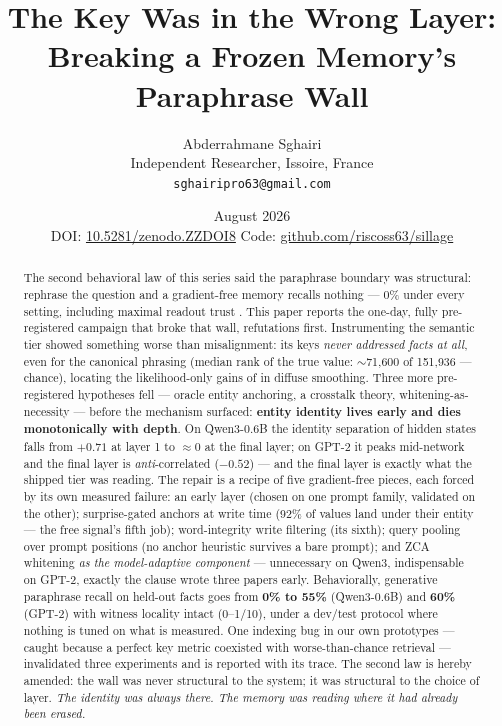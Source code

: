 \documentclass[11pt]{article}
\title{\bfseries The Key Was in the Wrong Layer:\\
Breaking a Frozen Memory's Paraphrase Wall}
\author{Abderrahmane Sghairi\\
\small Independent Researcher, Issoire, France\\
\small \texttt{sghairipro63@gmail.com}}
\date{August 2026\\[2pt]
\small DOI: \href{https://doi.org/10.5281/zenodo.ZZDOI8}{10.5281/zenodo.ZZDOI8}
\qquad Code: \href{https://github.com/riscoss63/sillage}{github.com/riscoss63/sillage}}
\begin{document}
\maketitle

\begin{abstract}
The second behavioral law of this series said the paraphrase boundary was structural: rephrase the question and a gradient-free memory recalls nothing --- 0\% under every setting, including maximal readout trust \cite{behavior}. This paper reports the one-day, fully pre-registered campaign that broke that wall, refutations first. Instrumenting the semantic tier showed something worse than misalignment: its keys \emph{never addressed facts at all}, even for the canonical phrasing (median rank of the true value: $\sim$71{,}600 of 151{,}936 --- chance), locating the likelihood-only gains of \cite{router} in diffuse smoothing. Three more pre-registered hypotheses fell --- oracle entity anchoring, a crosstalk theory, whitening-as-necessity --- before the mechanism surfaced: \textbf{entity identity lives early and dies monotonically with depth}. On Qwen3-0.6B the identity separation of hidden states falls from $+0.71$ at layer 1 to $\approx 0$ at the final layer; on GPT-2 it peaks mid-network and the final layer is \emph{anti}-correlated ($-0.52$) --- and the final layer is exactly what the shipped tier was reading. The repair is a recipe of five gradient-free pieces, each forced by its own measured failure: an early layer (chosen on one prompt family, validated on the other); surprise-gated anchors at write time (92\% of values land under their entity --- the free signal's fifth job); word-integrity write filtering (its sixth); query pooling over prompt positions (no anchor heuristic survives a bare prompt); and ZCA whitening \emph{as the model-adaptive component} --- unnecessary on Qwen3, indispensable on GPT-2, exactly the clause \cite{router} wrote three papers early. Behaviorally, generative paraphrase recall on held-out facts goes from \textbf{0\% to 55\%} (Qwen3-0.6B) and \textbf{60\%} (GPT-2) with witness locality intact (0--1/10), under a dev/test protocol where nothing is tuned on what is measured. One indexing bug in our own prototypes --- caught because a perfect key metric coexisted with worse-than-chance retrieval --- invalidated three experiments and is reported with its trace. The second law is hereby amended: the wall was never structural to the system; it was structural to the choice of layer. \emph{The identity was always there. The memory was reading where it had already been erased.}
\end{abstract}
\end{document}
